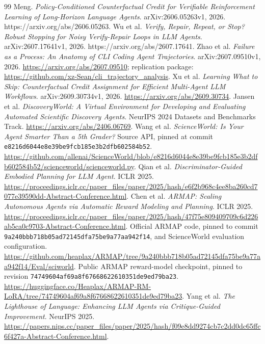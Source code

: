 \documentclass[11pt]{article}
\begin{document}
\begin{thebibliography}{99}
 Meng. \emph{Policy-Conditioned Counterfactual Credit for Verifiable Reinforcement Learning of Long-Horizon Language Agents}. arXiv:2606.05263v1, 2026. https://arxiv.org/abs/2606.05263.
 Wu et al. \emph{Verify, Repair, Repeat, or Stop? Robust Stopping for Noisy Verify-Repair Loops in LLM Agents}. arXiv:2607.17641v1, 2026. https://arxiv.org/abs/2607.17641.
 Zhao et al. \emph{Failure as a Process: An Anatomy of CLI Coding Agent Trajectories}. arXiv:2607.09510v1, 2026. \url{https://arxiv.org/abs/2607.09510}; replication package: \url{https://github.com/xz-Sean/cli_trajectory_analysis}.
 Xu et al. \emph{Learning What to Skip: Counterfactual Credit Assignment for Efficient Multi-Agent LLM Workflows}. arXiv:2609.30734v1, 2026. \url{https://arxiv.org/abs/2609.30734}.
 Jansen et al. \emph{DiscoveryWorld: A Virtual Environment for Developing and Evaluating Automated Scientific Discovery Agents}. NeurIPS 2024 Datasets and Benchmarks Track. \url{https://arxiv.org/abs/2406.06769}.
 Wang et al. \emph{ScienceWorld: Is Your Agent Smarter Than a 5th Grader?} Source API, pinned at commit \texttt{e8216d6044e8e39be9fcb185e3b2dfb602584b52}. \url{https://github.com/allenai/ScienceWorld/blob/e8216d6044e8e39be9fcb185e3b2dfb602584b52/scienceworld/scienceworld.py}.
 Qian et al. \emph{Discriminator-Guided Embodied Planning for LLM Agent}. ICLR 2025. \url{https://proceedings.iclr.cc/paper_files/paper/2025/hash/e6f2b968c4ee8ba260cd7077e39590dd-Abstract-Conference.html}.
 Chen et al. \emph{ARMAP: Scaling Autonomous Agents via Automatic Reward Modeling and Planning}. ICLR 2025. \url{https://proceedings.iclr.cc/paper_files/paper/2025/hash/47f75e809409709c6d226ab5ca0c9703-Abstract-Conference.html}.
 Official ARMAP code, pinned to commit \texttt{9a240bbb718b05ad72145dfa75be9a77aa942f14}, and ScienceWorld evaluation configuration. \url{https://github.com/heaplax/ARMAP/tree/9a240bbb718b05ad72145dfa75be9a77aa942f14/Eval/sciworld}.
 Public ARMAP reward-model checkpoint, pinned to revision \texttt{74749604af69a8f67668622610351de9ed79ba23}. \url{https://huggingface.co/Heaplax/ARMAP-RM-LoRA/tree/74749604af69a8f67668622610351de9ed79ba23}.
 Yang et al. \emph{The Lighthouse of Language: Enhancing LLM Agents via Critique-Guided Improvement}. NeurIPS 2025. \url{https://papers.nips.cc/paper_files/paper/2025/hash/f09e8dd9274cb7c2dd0dc65ffc6f427a-Abstract-Conference.html}.
\end{thebibliography}
\end{document}
